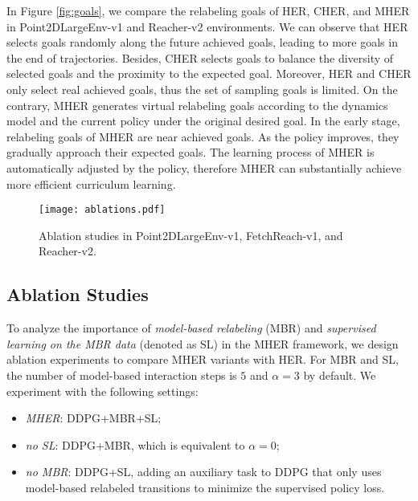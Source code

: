 \documentclass{article}
\begin{document}
In Figure \ref{fig:goals}, we compare the relabeling goals of HER, CHER, and MHER in Point2DLargeEnv-v1 and Reacher-v2 environments. We can observe that HER selects goals randomly along the future achieved goals, leading to more goals in the end of trajectories. Besides, CHER selects goals to balance the diversity of selected goals and the proximity to the expected goal. Moreover, HER and CHER only select real achieved goals, thus the set of sampling goals is limited. On the contrary, MHER generates virtual relabeling goals according to the dynamics model and the current policy under the original desired goal. In the early stage, relabeling goals of MHER are near achieved goals. As the policy improves, they gradually approach their expected goals. The learning process of MHER is automatically adjusted by the policy, therefore MHER can substantially achieve more efficient curriculum learning.







\begin{figure}[t]
    \centering
    \texttt{[image: ablations.pdf]}
    \caption{Ablation studies in Point2DLargeEnv-v1, FetchReach-v1, and Reacher-v2.}
    \label{fig:ablations}
\end{figure}

\subsection{Ablation Studies}
To analyze the importance of \emph{model-based relabeling} (MBR) and \emph{supervised learning on the MBR data} (denoted as SL) in the MHER framework, we design ablation experiments to compare MHER variants with HER. For MBR and SL, the number of model-based interaction steps is $5$ and $\alpha=3$ by default. We experiment with the following settings:
\begin{itemize}
    \item \emph{MHER}: DDPG+MBR+SL;
    \item \emph{no SL}: DDPG+MBR, which is equivalent to $\alpha=0$;
    \item \emph{no MBR}: DDPG+SL, adding an auxiliary task to DDPG that only uses model-based relabeled transitions to minimize the supervised policy loss. 
\end{itemize}
\end{document}
